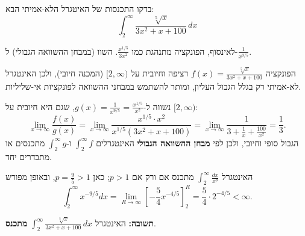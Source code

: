 
\begin{question}
בדקו התכנסות של האיטגרל הלא-אמיתי הבא:
\[ \int_2^\infty \frac{\sqrt[5]{x}}{3x^2+x+100}\,dx \]
\end{question}

\begin{hint}
לאינסוף, הפונקציה מתנהגת כמו $\frac{x^{1/5}}{3x^2}$. השוו (במבחן ההשוואה הגבולי) ל-$\frac{1}{x^{9/5}}$.
\end{hint}

\begin{solution}
הפונקציה $f(x)=\frac{\sqrt[5]{x}}{3x^2+x+100}$ רציפה וחיובית על $[2,\infty)$ (המכנה חיובי), ולכן האינטגרל לא-אמיתי רק בגלל הגבול העליון, ומותר להשתמש במבחני ההשוואה לפונקציות אי-שליליות.

נשווה ל-$g(x)=\frac{1}{x^{9/5}}=\frac{x^{1/5}}{x^2}$, שגם היא חיובית על $[2,\infty)$:
\[ \lim_{x\to\infty}\frac{f(x)}{g(x)}=\lim_{x\to\infty}\frac{x^{1/5}\cdot x^{2}}{x^{1/5}(3x^2+x+100)}=\lim_{x\to\infty}\frac{1}{3+\frac1x+\frac{100}{x^2}}=\frac13. \]
הגבול סופי וחיובי, ולכן לפי \textbf{מבחן ההשוואה הגבולי} האינטגרלים $\int_2^\infty f$ ו-$\int_2^\infty g$ מתכנסים או מתבדרים יחד.

האינטגרל $\int_2^\infty\frac{dx}{x^p}$ מתכנס אם ורק אם $p>1$; כאן $p=\frac95>1$, ובאופן מפורש
\[ \int_2^\infty x^{-9/5}dx=\lim_{R\to\infty}\left[-\frac54x^{-4/5}\right]_2^R=\frac54\cdot2^{-4/5}<\infty. \]

\textbf{תשובה:} האינטגרל $\int_2^\infty\frac{\sqrt[5]{x}}{3x^2+x+100}\,dx$ \textbf{מתכנס}.
\end{solution}
